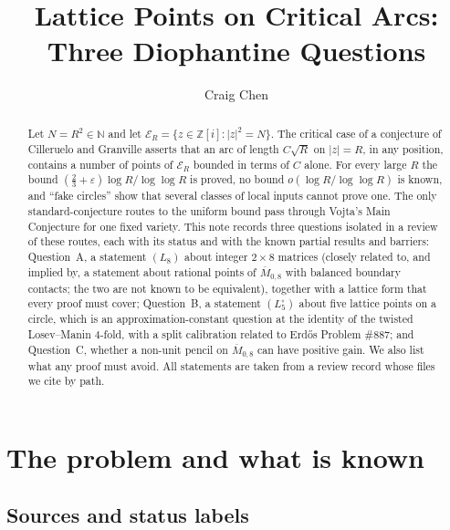 \documentclass[11pt]{article}
\title{Lattice Points on Critical Arcs:\\ Three Diophantine Questions}
\author{Craig Chen}
\date{}
\newcommand{\N}{\mathbb N}
\newcommand{\GI}{\mathbb Z[i]}
\newcommand{\E}{\mathcal E}
\newcommand{\Mbar}{\overline M_{0,8}}
\begin{document}
\maketitle

\begin{abstract}
Let \(N=R^2\in\N\) and let \(\E_R=\{z\in\GI:|z|^2=N\}\).  The critical case
of a conjecture of Cilleruelo and Granville asserts that an arc of length
\(C\sqrt R\) on \(|z|=R\), in any position, contains a number of points of
\(\E_R\) bounded in terms of \(C\) alone.  For every large \(R\) the bound
\((\frac23+\varepsilon)\log R/\log\log R\) is proved, no bound
\(o(\log R/\log\log R)\) is known, and ``fake circles'' show that several
classes of local inputs cannot prove one.  The only standard-conjecture
routes to the uniform bound pass through Vojta's Main Conjecture for one
fixed variety.  This note records three questions isolated in a review of
these routes, each with its status and with the known partial results and
barriers: Question~A, a statement \((L_8)\) about integer \(2\times8\) matrices
(closely related to, and implied by, a statement about rational points of
\(\Mbar\) with balanced boundary contacts; the two are not known to be
equivalent), together with a lattice form that every proof must cover;
Question~B, a statement \((L_5^\circ)\) about five lattice points on a circle,
which is an approximation-constant question at the identity of the twisted
Losev--Manin \(4\)-fold, with a split calibration related to Erd\H{o}s Problem
\#887; and Question~C, whether a non-unit pencil on \(\Mbar\) can have
positive gain.  We also list what any proof must avoid.  All statements are
taken from a review record whose files we cite by path.
\end{abstract}

\tableofcontents

\section{The problem and what is known}\label{sec:problem}

\subsection{Sources and status labels}
\end{document}
